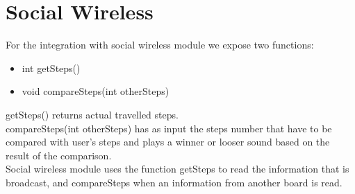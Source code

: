 \documentclass[a4paper,12pt,oneside]{report}
\begin{document}
\section{Social Wireless}

For the integration with social wireless module we expose two functions:
\begin{itemize}
\item int getSteps()
\item void compareSteps(int otherSteps)
\end{itemize}
getSteps() returns actual travelled steps.\\
compareSteps(int otherSteps) has as input the steps number that have to be compared with user's steps and plays a winner or looser sound based on the result of the comparison.\\
Social wireless module uses the function getSteps to read the information that is broadcast, and compareSteps when an information from another board is read.
\end{document}
